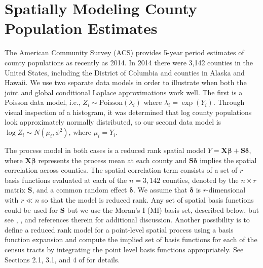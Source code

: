 \documentclass[12pt]{article}
\begin{document}
\section{Spatially Modeling County Population Estimates}\label{sec:pop}
The American Community Survey (ACS) provides 5-year period estimates of county populations as recently as 2014. In 2014 there were 3,142 counties in the United States, including the District of Columbia and counties in Alaska and Hawaii.  We use two separate data models in order to illustrate when both the joint and global conditional Laplace approximations work well. The first is a Poisson data model, i.e., $Z_i \sim \mathrm{Poisson}(\lambda_i)$ where $\lambda_i = \exp(Y_i)$. Through visual inspection of a histogram, it was determined that log county populations look approximately normally distributed, so our second data model is $\log Z_i \sim N(\mu_i, \phi^2)$, where $\mu_i = Y_i$. 

The process model in both cases is a reduced rank spatial model $Y = \bm{X}\bm{\beta} + \bm{S}\bm{\delta}$, where $\bm{X}\bm{\beta}$ represents the process mean at each county and $\bm{S}\bm{\delta}$ implies the spatial correlation across counties. The spatial correlation term consists of a set of $r$ basis functions evaluated at each of the $n=3,142$ counties, denoted by the $n\times r$ matrix $\bm{S}$, and a common random effect $\bm{\delta}$. We assume that $\bm{\delta}$ is $r$-dimensional with $r \ll n$ so that the model is reduced rank. Any set of spatial basis functions could be used for $\bm{S}$ but we use the Moran's I (MI) basis set, described below, but see \citet{hughes2013dimension}, \citet{porter2015bayesian}, \citet{bradley2015multivariate} and references therein for additional discussion. Another possibility is to define a reduced rank model for a point-level spatial process using a basis function expansion and compute the implied set of basis functions for each of the census tracts by integrating the point level basis functions appropriately. See Sections 2.1, 3.1, and 4 of \citet{bradley2016regionalization} for details.
\end{document}
